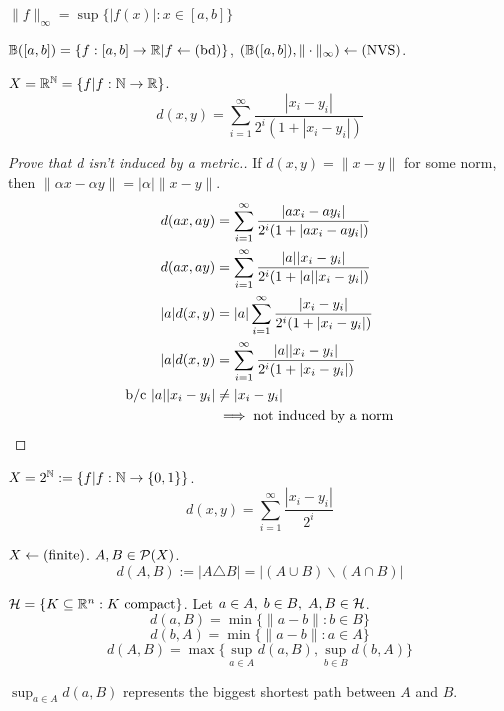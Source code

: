\documentclass[12pt]{article}
\begin{document}
\bboxex
\begin{exam}\label{exam:infinity_norm_on_functions}
  \(\|f\|_\infty=\sup\{|f(x)|:x\in[a,b]\}\) 
\end{exam}
\ebox


\bboxex
\begin{exam}\label{exam:bounded_functions_and_the_infinity_norm_are_a_nvs}
  \(\mathbb B([a,b])=\{f:[a,b]\to\mathbb R|f\leftarrow(\mathrm{bd})\}\), \((\mathbb B([a,b]),\|\cdot\|_\infty)\leftarrow(\mathrm{NVS})\).
\end{exam}
\ebox


\bboxex
\begin{exam}
  \(X=\mathbb R^\mathbb N=\{f|f:\mathbb N\to\mathbb R\}\). 
  \[d(x,y)=\sum_{i=1}^\infty\frac{|x_i-y_i|}{2^i(1+|x_i-y_i|)}\]
  \bboxproof
  \begin{proof}[Prove that d isn't induced by a metric.]
    If \(d(x,y)=\|x-y\|\) for some norm, then \(\|\alpha x-\alpha y\|
    =|\alpha|\|x-y\|\).
    \begin{align*}
      d(ax,ay)&=\sum_{i=1}^\infty\frac{|ax_i-ay_i|}{2^i(1+|ax_i-ay_i|)}\\
      d(ax,ay)&=\sum_{i=1}^\infty\frac{|a||x_i-y_i|}{2^i(1+|a||x_i-y_i|)}\\
      |a|d(x,y)&=|a|\sum_{i=1}^\infty\frac{|x_i-y_i|}{2^i(1+|x_i-y_i|)}\\
      |a|d(x,y)&=\sum_{i=1}^\infty\frac{|a||x_i-y_i|}{2^i(1+|x_i-y_i|)}\\
      \text{b/c }|a||x_i-y_i|&\neq |x_i-y_i|\\
                          &\implies\text{not induced by a norm}
    \end{align*}
  \end{proof}
  \ebox
\end{exam}
\ebox

\bboxex
\begin{exam}\label{exam:cantor_space}
  \(X=2^\mathbb N:=\{f|f:\mathbb N\to\{0,1\}\}\). 
  \[d(x,y)=\sum_{i=1}^\infty\frac{|x_i-y_i|}{2^i}\]
\end{exam}
\ebox

\bboxex
\begin{exam}\label{exam:hamming_distace}
  \(X\leftarrow(\mathrm{finite})\). \(A,B\in\mathcal P(X)\). 
  \[d(A,B):=|A\triangle B|=|(A\cup B)\backslash(A\cap B)|\]
\end{exam}
\ebox

\bboxex
\begin{exam}
  \(\mathcal H=\{K\subseteq\mathbb R^n:K\text{ compact}\}\). Let 
  \(a\in A,\;b\in B,\;A,B\in\mathcal H\).
  \[d(a,B)=\min\{\|a-b\|:b\in B\}\]
  \[d(b,A)=\min\{\|a-b\|:a\in A\}\]
  \[d(A,B)=\max\{\sup_{a\in A}d(a,B),\sup_{b\in B}d(b,A)\}\]

  \bboxnote
  \begin{note}
    \(\sup_{a\in A}d(a,B)\) represents the biggest shortest path between
    \(A\) and \(B\).
  \end{note}
  \ebox
\end{exam}
\ebox
\end{document}
